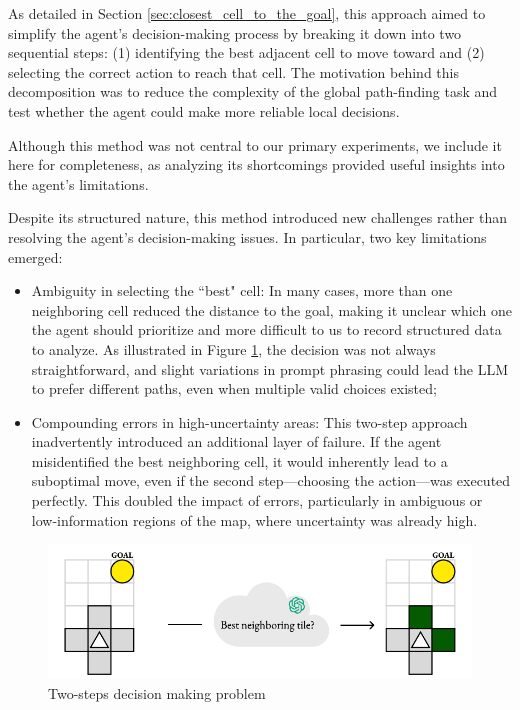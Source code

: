 As detailed in Section \ref{sec:closest_cell_to_the_goal}, this approach aimed
to simplify the agent's decision-making process by breaking it down into two
sequential steps: (1) identifying the best adjacent cell to move toward and (2) selecting
the correct action to reach that cell. The motivation behind this decomposition
was to reduce the complexity of the global path-finding task and test whether
the agent could make more reliable local decisions.

Although this method was not central to our primary experiments, we include it here
for completeness, as analyzing its shortcomings provided useful insights into
the agent's limitations.

Despite its structured nature, this method introduced new challenges rather than
resolving the agent's decision-making issues. In particular, two key limitations
emerged:
\begin{itemize}
  \item Ambiguity in selecting the ``best" cell: In many cases, more than one
    neighboring cell reduced the distance to the goal, making it unclear which one
    the agent should prioritize and more difficult to us to record structured data
    to analyze. As illustrated in Figure \ref{fig:extra2}, the decision was not always
    straightforward, and slight variations in prompt phrasing could lead the LLM
    to prefer different paths, even when multiple valid choices existed;

  \item Compounding errors in high-uncertainty areas: This two-step approach
    inadvertently introduced an additional layer of failure. If the agent misidentified
    the best neighboring cell, it would inherently lead to a suboptimal move, even
    if the second step—choosing the action—was executed perfectly. This doubled
    the impact of errors, particularly in ambiguous or low-information regions of
    the map, where uncertainty was already high.
\end{itemize}

\vspace{7mm}
\begin{figure}[h!]
  \centering
  \includegraphics[width=.66\textwidth]{images/results_discussion/extra2.pdf}
  \caption{Two-steps decision making problem}
  \label{fig:extra2}
\end{figure}
\vspace{7mm}

